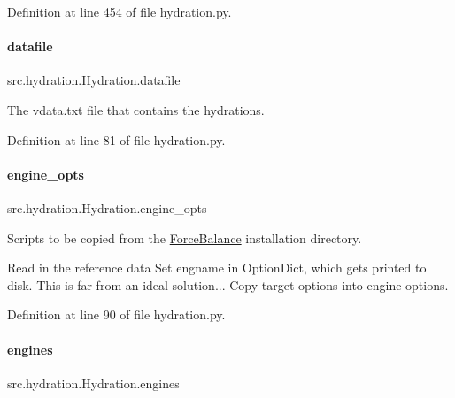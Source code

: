 Definition at line 454 of file hydration.\+py.

\mbox{\label{classsrc_1_1hydration_1_1Hydration_a06f258414131a1e0abd30a2a4152f60d}} 
\paragraph{\texorpdfstring{datafile}{datafile}}
{\footnotesize\ttfamily src.\+hydration.\+Hydration.\+datafile}



The vdata.\+txt file that contains the hydrations. 



Definition at line 81 of file hydration.\+py.

\mbox{\label{classsrc_1_1hydration_1_1Hydration_a89c98ff979b976c89ca6e50390133b17}} 
\paragraph{\texorpdfstring{engine\+\_\+opts}{engine\_opts}}
{\footnotesize\ttfamily src.\+hydration.\+Hydration.\+engine\+\_\+opts}



Scripts to be copied from the \hyperlink{namespaceForceBalance}{Force\+Balance} installation directory. 

Read in the reference data Set engname in Option\+Dict, which gets printed to disk. This is far from an ideal solution... Copy target options into engine options. 

Definition at line 90 of file hydration.\+py.

\mbox{\label{classsrc_1_1hydration_1_1Hydration_a161aab5e098f13ac8006ea8415814580}} 
\paragraph{\texorpdfstring{engines}{engines}}
{\footnotesize\ttfamily src.\+hydration.\+Hydration.\+engines}



